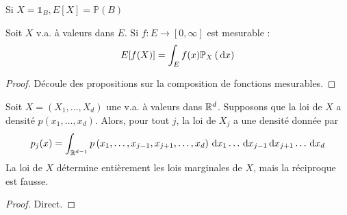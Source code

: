 \documentclass{cours}
\begin{document}
\begin{proposition}
    Si $X = \mathds{1}_{B}, E[X] = \mathbb{P}(B)$
\end{proposition}

\begin{proposition}
    Soit $X$ v.a. à valeurs dans $E$. Si $f : E \rightarrow \left[0, \infty\right]$ est mesurable :
    \[
        E[f(X)] = \int_{E} f(x)\mathbb{P}_{X}\left({\rm \, d} x\right)
    \]
\end{proposition}
\begin{proof}
    Découle des propositions sur la composition de fonctions mesurables.
\end{proof}

\begin{proposition}
    Soit $X = \left(X_{1}, \ldots, X_{d}\right)$ une v.a. à valeurs dans $\mathbb{R}^{d}$. Supposons que la loi de $X$ a densité $p\left(x_{1}, \ldots, x_{d}\right)$. Alors, pour tout $j$, la loi de $X_{j}$ a une densité donnée par
    \[
        p_{j}(x) = \int_{\mathbb{R}^{d - 1}} p\left(x_{1}, \ldots, x_{j - 1}, x_{j + 1}, \ldots, x_{d}\right){\rm \, d} x_{1} \ldots {\rm \, d} x_{j - 1} {\rm \, d} x_{j + 1}\ldots {\rm \, d} x_{d}
    \]
    La loi de $X$ détermine entièrement les lois marginales de $X$, mais la réciproque est fausse.
\end{proposition}
\begin{proof}
    Direct.
\end{proof}
\end{document}
